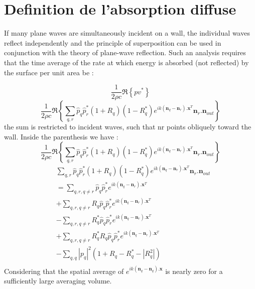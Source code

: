 \documentclass[
a4paper, %
12pt, %
]{SourcesTemplate/TemplateReport}
\begin{document}
\section{Definition de l'absorption diffuse}
If many plane waves are simultaneously incident on a wall, the individual waves reflect independently and the principle of superposition can be used in conjunction with the theory of plane-wave reflection. Such an analysis requires that the time average of the rate at which energy is absorbed (not reflected) by the surface per unit area be : 

\begin{equation}
	\frac{1}{2\rho c}\Re \left\{ pv^*\right\}
\end{equation}
\begin{equation}
	\frac{1}{2\rho c}\Re \left\{  \sum_{q, r}  \hat{p}_q  \hat{p}_r^*(1+R_q)(1-R_q^*) e^{ik(\mathbf{n}_q-\mathbf{n}_r).\mathbf{x}^T} \mathbf{n}_r.\mathbf{n}_{out}\right\}
\end{equation}
the sum is restricted to incident waves, such that nr points obliquely toward the wall.
Inside the parenthesis we have : 
\begin{equation}
	\frac{1}{2\rho c}\Re \left\{  \sum_{q, r}  \hat{p}_q  \hat{p}_r^*(1+R_q)(1-R_q^*) e^{ik(\mathbf{n}_q-\mathbf{n}_r).\mathbf{x}^T} \mathbf{n}_r.\mathbf{n}_{out}\right\}
\end{equation}
\begin{equation}
	\begin{split}
  &\sum_{q, r}  \hat{p}_q  \hat{p}_r^*(1+R_q)(1-R_q^*) e^{ik(\mathbf{n}_q-\mathbf{n}_r).\mathbf{x}^T} \mathbf{n}_r.\mathbf{n}_{out} \\
  &=  \sum_{q, r, q\neq r}  \hat{p}_q  \hat{p}_r^* e^{ik(\mathbf{n}_q-\mathbf{n}_r).\mathbf{x}^T} \\
  &+ \sum_{q, r, q\neq r} R_q \hat{p}_q  \hat{p}_r^* e^{ik(\mathbf{n}_q-\mathbf{n}_r).\mathbf{x}^T} \\
  & -\sum_{q, r, q\neq r} {R}_q^* \hat{p}_q  \hat{p}_r^* e^{ik(\mathbf{n}_q-\mathbf{n}_r).\mathbf{x}^T} \\
  &+ \sum_{q, r, q\neq r} {R}_q^*R_q \hat{p}_q  \hat{p}_r^* e^{ik(\mathbf{n}_q-\mathbf{n}_r).\mathbf{x}^T} \\
&- \sum_{q, q} \left|p_q\right|^2  (1+R_q - R_q^*-\left|R_q^2\right|)  \\
	\end{split}
\end{equation}
Considering that the spatial average of $e^{ik(\mathbf{n}_q-\mathbf{n}_q ) . \mathbf{x}}$ is nearly zero for a sufficiently large averaging volume.
\end{document}
